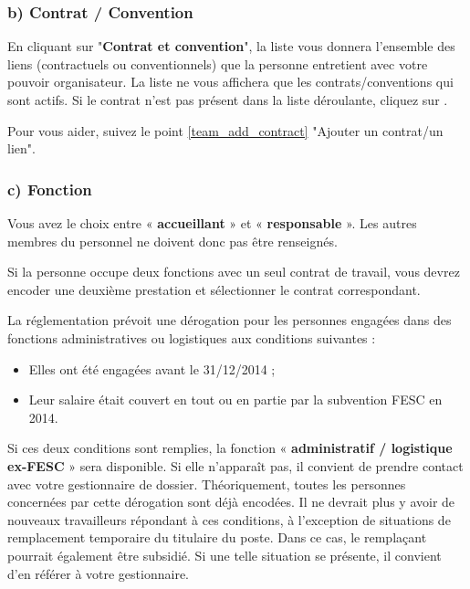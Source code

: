 \subsubsection{b) Contrat / Convention}
En cliquant sur "\textbf{Contrat et convention}", la liste vous donnera l'ensemble des liens (contractuels ou conventionnels) que la personne entretient avec votre pouvoir organisateur. La liste ne vous affichera que les contrats/conventions qui sont actifs. Si le contrat n'est pas présent dans la liste déroulante, cliquez sur . 


\begin{conseil}
Pour vous aider, suivez le point \ref{team_add_contract} "Ajouter un contrat/un lien". \end{conseil}    








\subsubsection{c) Fonction}
Vous avez le choix entre « \textbf{accueillant} » et « \textbf{responsable} ». Les autres membres du personnel ne doivent donc pas être renseignés.

Si la personne occupe deux fonctions avec un seul contrat de travail, vous devrez encoder une deuxième prestation et sélectionner le contrat correspondant.



\begin{info}\normalfont 
La réglementation prévoit une dérogation pour les personnes engagées dans des fonctions administratives ou logistiques aux conditions suivantes : 
\begin{itemize}
    \item Elles ont été engagées avant le 31/12/2014 ;
    \item Leur salaire était couvert en tout ou en partie par la subvention FESC en 2014.
\end{itemize}


Si ces deux conditions sont remplies, la fonction « \textbf{administratif / logistique ex-FESC} » sera disponible. Si elle n’apparaît pas, il convient de prendre contact avec votre gestionnaire de dossier. 
Théoriquement, toutes les personnes concernées par cette dérogation sont déjà encodées. Il ne devrait plus y avoir de nouveaux travailleurs répondant à ces conditions, à l’exception de situations de remplacement temporaire du titulaire du poste. Dans ce cas, le remplaçant pourrait également être subsidié. Si une telle situation se présente, il convient d’en référer à votre gestionnaire.  
\end{info}







